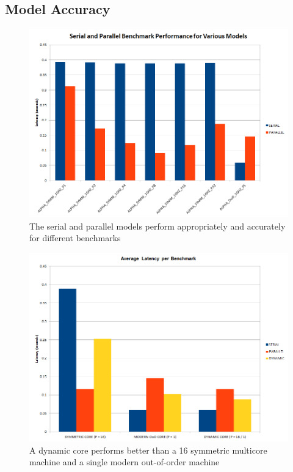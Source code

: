 \subsection{Model Accuracy}
\begin{figure}
    \centering
    \includegraphics[scale=0.8]{../images/SerialParallelBenchmarks-Latency.png}
    \caption{The serial and parallel models perform appropriately and accurately for different benchmarks}
    \label{fig:serialparallel}
\end{figure}
\begin{figure}
    \centering
    \includegraphics[scale=0.8]{../images/DynamicBenchmark-Latency-16.png}
    \caption{A dynamic core performs better than a 16 symmetric multicore machine and a single modern out-of-order machine}
    \label{fig:dynamic}
\end{figure}
